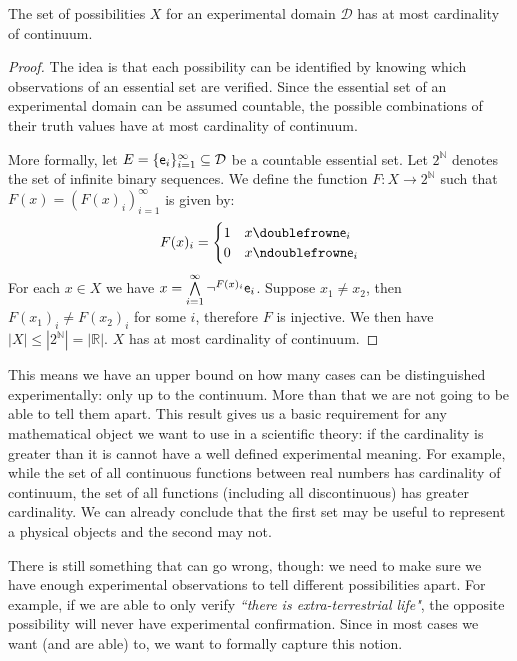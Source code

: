 \documentclass[11pt,letterpaper,fleqn]{memoir} %
\begin{document}
\begin{mathSection}
	\begin{prop}
		The set of possibilities $X$ for an experimental domain $\mathcal{D}$ has at most cardinality of continuum.
	\end{prop}
	
	\begin{proof}
		The idea is that each possibility can be identified by knowing which observations of an essential set are verified. Since the essential set of an experimental domain can be assumed countable, the possible combinations of their truth values have at most cardinality of continuum.
		
		More formally, let $E = \{\mathsf{e}_i\}_{i=1}^{\infty} \subseteq \mathcal{D}$ be a countable essential set. Let $2^{\mathbb{N}}$ denotes the set of infinite binary sequences. We define the function $F:X\to2^{\mathbb{N}}$ such that $F(x) = (F(x)_i)_{i=1}^{\infty}$ is given by: 
		$$
		F(x)_i = 
		\begin{cases}
		1 & x \comp \obs{e}_i \\
		0 & x \ncomp \obs{e}_i
		\end{cases}
		$$
		For each $x \in X$ we have $x = \bigwedge\limits_{i=1}^{\infty} \neg^{F(x)_i} \mathsf{e}_i$. Suppose $x_1 \neq x_2$, then $F(x_1)_i \neq F(x_2)_i$ for some $i$, therefore $F$ is injective. We then have $|X| \leq |2^{\mathbb{N}}|=|\mathbb{R}|$. $X$ has at most cardinality of continuum.
	\end{proof}
\end{mathSection}

This means we have an upper bound on how many cases can be distinguished experimentally: only up to the continuum. More than that we are not going to be able to tell them apart. This result gives us a basic requirement for any mathematical object we want to use in a scientific theory: if the cardinality is greater than it is cannot have a well defined experimental meaning. For example, while the set of all continuous functions between real numbers has cardinality of continuum, the set of all functions (including all discontinuous) has greater cardinality. We can already conclude that the first set may be useful to represent a physical objects and the second may not.

There is still something that can go wrong, though: we need to make sure we have enough experimental observations to tell different possibilities apart. For example, if we are able to only verify \emph{``there is extra-terrestrial life"}, the opposite possibility will never have experimental confirmation. Since in most cases we want (and are able) to, we want to formally capture this notion.
\end{document}
